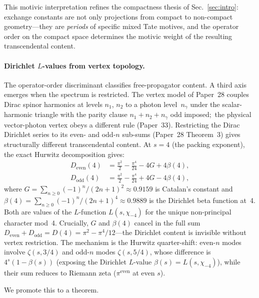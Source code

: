 \documentclass[aps,pra,twocolumn,superscriptaddress,longbibliography]{revtex4-2}
\begin{document}
This motivic interpretation refines the compactness thesis of
Sec.~\ref{sec:intro}: exchange constants are not only projections from
compact to non-compact geometry---they are \emph{periods} of specific
mixed Tate motives, and the operator order on the compact space
determines the motivic weight of the resulting transcendental content.

\paragraph{Dirichlet $L$-values from vertex topology.}
The operator-order discriminant classifies free-propagator content.
A third axis emerges when the spectrum is restricted.  The vertex
model of Paper~28 couples Dirac spinor harmonics at levels $n_1$,
$n_2$ to a photon level~$n_\gamma$ under the scalar-harmonic triangle
with the parity clause $n_1 + n_2 + n_\gamma$ odd imposed;\ the
physical vector-photon vertex obeys a different rule (Paper~33).
Restricting the Dirac Dirichlet series to its even- and odd-$n$
sub-sums (Paper~28 Theorem~3) gives structurally different
transcendental content.  At $s = 4$ (the packing exponent), the
exact Hurwitz decomposition gives:
\begin{align}
  D_{\text{even}}(4) &= \tfrac{\pi^2}{2} - \tfrac{\pi^4}{24}
    - 4G + 4\beta(4), \label{eq:d_even4} \\
  D_{\text{odd}}(4) &= \tfrac{\pi^2}{2} - \tfrac{\pi^4}{24}
    + 4G - 4\beta(4), \label{eq:d_odd4}
\end{align}
where $G = \sum_{n \ge 0} (-1)^n/(2n{+}1)^2 \approx 0.9159$ is
Catalan's constant and $\beta(4) = \sum_{n \ge 0} (-1)^n/(2n{+}1)^4
\approx 0.9889$ is the Dirichlet beta function at~4.  Both are values
of the $L$-function $L(s, \chi_{-4})$ for the unique non-principal
character mod~4.  Crucially, $G$ and $\beta(4)$ cancel in the full sum
$D_{\text{even}} + D_{\text{odd}} = D(4) = \pi^2 - \pi^4/12$---the
Dirichlet content is invisible without vertex restriction.  The
mechanism is the Hurwitz quarter-shift: even-$n$ modes involve
$\zeta(s, 3/4)$ and odd-$n$ modes $\zeta(s, 5/4)$, whose difference
is $4^s(1 - \beta(s))$ (exposing the Dirichlet $L$-value
$\beta(s) = L(s, \chi_{-4})$), while their sum reduces
to Riemann zeta ($\pi^{\text{even}}$ at even $s$).

We promote this to a theorem.
\end{document}
